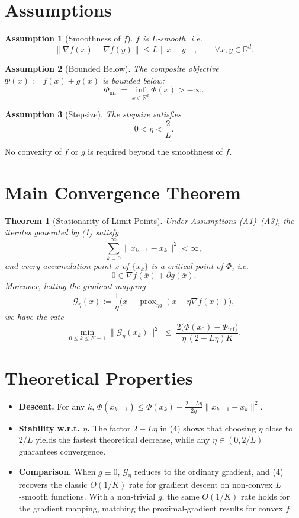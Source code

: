 \documentclass{article}
\newtheorem{theorem}{Theorem}
\newtheorem{assumption}{Assumption}
\newcommand{\prox}{\operatorname{prox}}
\newcommand{\grad}{\nabla}
\newcommand{\R}{\mathbb{R}}
\begin{document}
\newpage

\section*{Assumptions}
\begin{assumption}[Smoothness of $f$]
$f$ is $L$‑smooth, i.e.
\[
\|\grad f(x)-\grad f(y)\|\le L\|x-y\|,\qquad\forall x,y\in\R^d.
\tag{A1}
\]
\end{assumption}
\begin{assumption}[Bounded Below]
The composite objective $\Phi(x):=f(x)+g(x)$ is bounded below:
\[
\Phi_{\inf}:=\inf_{x\in\R^d}\Phi(x)>-\infty .
\tag{A2}
\]
\end{assumption}
\begin{assumption}[Stepsize]
The stepsize satisfies
\[
0<\eta<\frac{2}{L}.
\tag{A3}
\]
\end{assumption}
No convexity of $f$ or $g$ is required beyond the smoothness of $f$.

\section*{Main Convergence Theorem}
\begin{theorem}[Stationarity of Limit Points]\label{thm:main}
Under Assumptions (A1)–(A3), the iterates generated by (1) satisfy
\[
\sum_{k=0}^{\infty}\|x_{k+1}-x_k\|^2<\infty,
\]
and every accumulation point $\bar x$ of $\{x_k\}$ is a \emph{critical point} of $\Phi$, i.e.
\[
0\in \grad f(\bar x)+\partial g(\bar x).
\tag{3}
\]
Moreover, letting the \emph{gradient mapping}
\[
\mathcal{G}_\eta(x):=\frac{1}{\eta}\bigl(x-\prox_{\eta g}(x-\eta\grad f(x))\bigr),
\]
we have the rate
\[
\min_{0\le k\le K-1}\|\mathcal{G}_\eta(x_k)\|^2
\;\le\;
\frac{2\bigl(\Phi(x_0)-\Phi_{\inf}\bigr)}{\eta\,(2-L\eta)K}.
\tag{4}
\]
\end{theorem}

\section*{Theoretical Properties}
\begin{itemize}
\item \textbf{Descent.}  For any $k$, $\Phi(x_{k+1})\le\Phi(x_k)-\frac{2-L\eta}{2\eta}\|x_{k+1}-x_k\|^2$.
\item \textbf{Stability w.r.t. $\eta$.}  The factor $2-L\eta$ in (4) shows that choosing $\eta$ close to $2/L$ yields the fastest theoretical decrease, while any $\eta\in(0,2/L)$ guarantees convergence.
\item \textbf{Comparison.}  When $g\equiv0$, $\mathcal{G}_\eta$ reduces to the ordinary gradient, and (4) recovers the classic $O(1/K)$ rate for gradient descent on non‑convex $L$‑smooth functions. With a non‑trivial $g$, the same $O(1/K)$ rate holds for the gradient mapping, matching the proximal‑gradient results for convex $f$.
\end{itemize}
\end{document}
